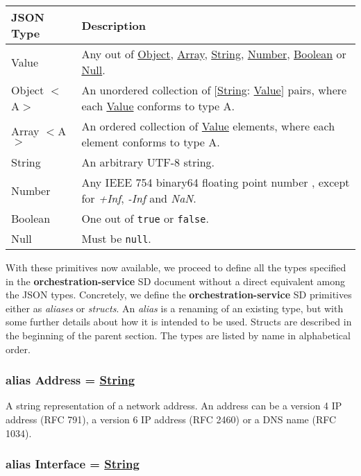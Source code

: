 \documentclass[a4paper]{arrowhead}
\newcommand{\pdef}[1]{{\textcolor{ArrowheadGrey}{#1 \label{sec:model:primitives:#1} \label{sec:model:primitives:#1s}}}}
\newcommand{\pref}[1]{{\textcolor{ArrowheadGrey}{\hyperref[sec:model:primitives:#1]{#1}}}}
\begin{document}
\begin{table}[ht!]
\begin{tabularx}{\textwidth}{| p{3cm} | X |} \hline
\rowcolor{gray!33} JSON Type & Description \\ \hline
\pdef{Value}                 & Any out of \pref{Object}, \pref{Array}, \pref{String}, \pref{Number}, \pref{Boolean} or \pref{Null}. \\ \hline
\pdef{Object}$<$A$>$         & An unordered collection of $[$\pref{String}: \pref{Value}$]$ pairs, where each \pref{Value} conforms to type A. \\ \hline
\pdef{Array}$<$A$>$          & An ordered collection of \pref{Value} elements, where each element conforms to type A. \\ \hline
\pdef{String}                & An arbitrary UTF-8 string. \\ \hline
\pdef{Number}                & Any IEEE 754 binary64 floating point number \cite{cowlishaw2019floating}, except for \textit{+Inf}, \textit{-Inf} and \textit{NaN}. \\ \hline
\pdef{Boolean}               & One out of \texttt{true} or \texttt{false}. \\ \hline
\pdef{Null}                  & Must be \texttt{null}. \\ \hline
\end{tabularx}
\end{table}

With these primitives now available, we proceed to define all the types specified in the \textbf{orchestration-service} SD document without a direct equivalent among the JSON types.
Concretely, we define the \textbf{orchestration-service} SD primitives either as \textit{aliases} or \textit{structs}.
An \textit{alias} is a renaming of an existing type, but with some further details about how it is intended to be used.
Structs are described in the beginning of the parent section.
The types are listed by name in alphabetical order.

\subsubsection{alias \pdef{Address} = \pref{String}}

A string representation of a network address. An address can be a version 4 IP address (RFC 791), a version 6 IP address (RFC 2460) or a DNS name (RFC 1034).

\subsubsection{alias \pdef{Interface} = \pref{String}}
\end{document}
